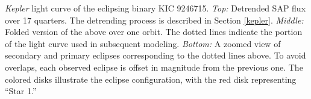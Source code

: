 \label{fig:keplerfig} \emph{Kepler} light curve of the eclipsing binary KIC 9246715. \emph{Top:} Detrended SAP flux over 17 quarters. The detrending process is described in Section \ref{kepler}. \emph{Middle:} Folded version of the above over one orbit. The dotted lines indicate the portion of the light curve used in subsequent modeling. \emph{Bottom:} A zoomed view of secondary and primary eclipses corresponding to the dotted lines above. To avoid overlaps, each observed eclipse is offset in magnitude from the previous one. The colored disks illustrate the eclipse configuration, with the red disk representing ``Star 1.''
